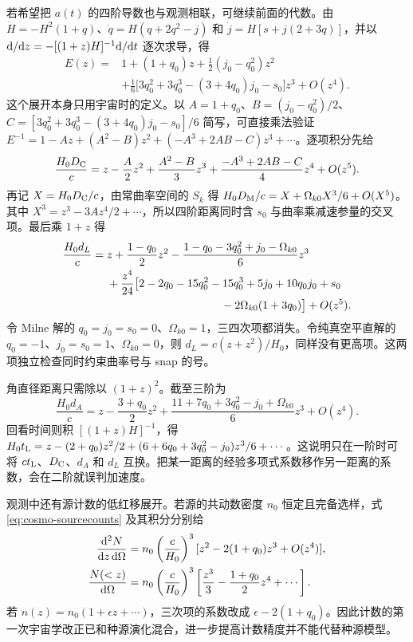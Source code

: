 若希望把 $a(t)$ 的四阶导数也与观测相联，可继续前面的代数。由 $\dot H=-H^2(1+q)$、$\dot q=H(q+2q^2-j)$ 和 $\dot j=H[s+j(2+3q)]$，并以 $\dd/\dd z=-[(1+z)H]^{-1}\dd/\dd t$ 逐次求导，得
\[
 \begin{split}
 E(z)={}&1+(1+q_0)z+\frac12(j_0-q_0^2)z^2\\
 &+\frac16\big[3q_0^2+3q_0^3-(3+4q_0)j_0-s_0\big]z^3+O(z^4).
 \end{split}
\]
这个展开本身只用宇宙时的定义。以 $A=1+q_0$、$B=(j_0-q_0^2)/2$、$C=[3q_0^2+3q_0^3-(3+4q_0)j_0-s_0]/6$ 简写，可直接乘法验证 $E^{-1}=1-Az+(A^2-B)z^2+(-A^3+2AB-C)z^3+\cdots$。逐项积分先给
\[
 \frac{H_0D_{\rm C}}c
 =z-\frac A2z^2+\frac{A^2-B}3z^3
                  +\frac{-A^3+2AB-C}4z^4+O(z^5).
\]
再记 $X=H_0D_{\rm C}/c$，由常曲率空间的 $S_k$ 得 $H_0D_{\rm M}/c=X+\Omega_{k0}X^3/6+O(X^5)$。其中 $X^3=z^3-3Az^4/2+\cdots$，所以四阶距离同时含 $s_0$ 与曲率乘减速参量的交叉项。最后乘 $1+z$ 得
\begin{equation}\label{eq:cosmo-cosmographic-four}
 \begin{split}
 \frac{H_0d_L}{c}={}&z+\frac{1-q_0}2z^2
  -\frac{1-q_0-3q_0^2+j_0-\Omega_{k0}}6z^3\\
 &+\frac{z^4}{24}\big[2-2q_0-15q_0^2-15q_0^3
       +5j_0+10q_0j_0+s_0\\
 &\hspace{36mm}-2\Omega_{k0}(1+3q_0)\big]+O(z^5).
 \end{split}
\end{equation}
令 Milne 解的 $q_0=j_0=s_0=0$、$\Omega_{k0}=1$，三四次项都消失。令纯真空平直解的 $q_0=-1$、$j_0=s_0=1$、$\Omega_{k0}=0$，则 $d_L=c(z+z^2)/H_0$，同样没有更高项。这两项独立检查同时约束曲率号与 snap 的号。

角直径距离只需除以 $(1+z)^2$。截至三阶为
\[
 \frac{H_0d_A}{c}=z-\frac{3+q_0}2z^2+
       \frac{11+7q_0+3q_0^2-j_0+\Omega_{k0}}6z^3+O(z^4).
\]
回看时间则积 $[(1+z)H]^{-1}$，得 $H_0t_{\rm L}=z-(2+q_0)z^2/2+(6+6q_0+3q_0^2-j_0)z^3/6+\cdots$。这说明只在一阶时可将 $ct_{\rm L}$、$D_{\rm C}$、$d_A$ 和 $d_L$ 互换。把某一距离的经验多项式系数移作另一距离的系数，会在二阶就误判加速度。

观测中还有源计数的低红移展开。若源的共动数密度 $n_0$ 恒定且完备选样，式 \eqref{eq:cosmo-sourcecounts} 及其积分分别给
\[
 \begin{aligned}
 \frac{\dd^2N}{\dd z\,\dd\Omega}
   &=n_0\left(\frac c{H_0}\right)^3[z^2-2(1+q_0)z^3+O(z^4)],\\
 \frac{N(<z)}{\dd\Omega}
   &=n_0\left(\frac c{H_0}\right)^3
                   \left[\frac{z^3}3-\frac{1+q_0}2z^4+\cdots\right].
 \end{aligned}
\]
若 $n(z)=n_0(1+\epsilon z+\cdots)$，三次项的系数改成 $\epsilon-2(1+q_0)$。因此计数的第一次宇宙学改正已和种源演化混合，进一步提高计数精度并不能代替种源模型。


